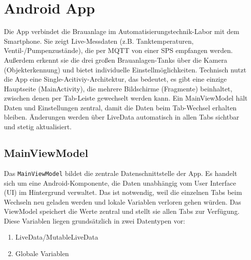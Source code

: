\section{Android App}
Die App verbindet die Brauanlage im Automatisierungstechnik-Labor mit dem Smartphone. Sie zeigt Live-Messdaten (z.B. Tanktemperaturen, Ventil-/Pumpenzustände), die per MQTT von einer SPS empfangen werden. Außerdem erkennt sie die drei großen Brauanlagen-Tanks über die Kamera (Objekterkennung) und bietet individuelle Einstellmöglichkeiten. Technisch nutzt die App eine Single-Acitiviy-Architektur, das bedeutet, es gibt eine einzige Hauptseite (MainActivity), die mehrere Bildschirme (Fragmente) beinhaltet, zwischen denen per Tab-Leiste gewechselt werden kann. Ein MainViewModel hält Daten und Einstellungen zentral, damit die Daten beim Tab-Wechsel erhalten bleiben. Änderungen werden über LiveData automatisch in allen Tabs sichtbar und stetig aktualisiert.


\subsection{MainViewModel}

Das \verb|MainViewModel| bildet die zentrale Datenschnittstelle der App. 
Es handelt sich um eine Android-Komponente, die Daten unabhängig vom User Interface (UI) im Hintergrund verwaltet.
Das ist notwendig, weil die einzelnen Tabs beim Wechseln neu geladen werden und lokale Variablen verloren gehen würden.
Das ViewModel speichert die Werte zentral und stellt sie allen Tabs zur Verfügung.
\noindent
Diese Variablen liegen grundsätzlich in zwei Datentypen vor:
\begin{enumerate}
    \item LiveData/MutableLiveData
    \item Globale Variablen 
\end{enumerate}


